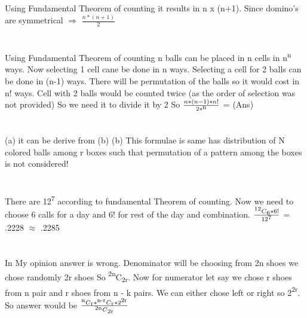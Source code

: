 \documentclass{report}
\begin{document}
{	\section{}
	Using Fundamental Theorem of counting it results in n x (n+1).
	Since domino's are symmetrical {$\Rightarrow$} {$\frac{n * (n + 1)}{2}$}
	
	\section{}
	Using Fundamental Theorem of counting n balls can be placed in n cells in n{\textsuperscript{n}} ways. Now selecting 1 cell cane be done in n ways. Selecting a cell for 2 balls can be done in (n-1) ways. There will be permutation of the balls so it would cost in n! ways. Cell with 2 balls would be counted twice (as the order of selection was not provided) So we need it to divide it by 2 So {$\frac{n * (n-1) * n!}{2 * {\textsuperscript{n}}}$} = (Ans)
	
	\section{}
	(a) it can be derive from (b)
	{\newline}
	(b) This formulae is same has distribution of N colored balls among r boxes such that permutation of a pattern among the boxes is not considered!
	
	\section{}
	There are 12{\textsuperscript{7}} according to fundamental Theorem of counting. Now we need to choose 6 calls for a day and 6! for rest of the day and combination. {$\frac{{\textsuperscript{12}C{\textsubscript{6}}}  * 6!}{12{\textsuperscript{7}}}$} = .2228 {$\approx$} .2285
	
	\section{}
	In My opinion answer is wrong. Denominator will be choosing from 2n shoes we chose randomly 2r shoes So {\textsuperscript{2n}}C{\textsubscript{2r}}.
	Now for numerator let say we chose r shoes from n pair and r shoes from n - k pairs. We can either chose left or right so 2{\textsuperscript{2r}}. So answer would be {$\frac{{\textsuperscript{n}}C{\textsubscript{r}} *   {\textsuperscript{n-r}}C{\textsubscript{r}} * 2{\textsuperscript{2r}}}{{\textsuperscript{2n}}C{\textsubscript{2r}}}$}
	
}
\end{document}
